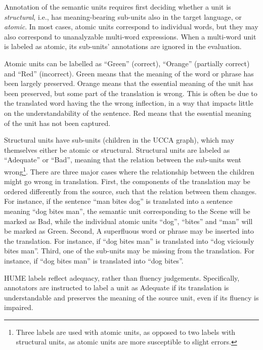 \documentclass[11pt,letterpaper]{article}
\newcommand{\XXX}[1]{{\color{red}XXX #1}} %
\begin{document}
Annotation of the semantic units requires first deciding whether
a unit is {\it structural}, i.e., has meaning-bearing sub-units also in the
target language,
or {\it atomic}. In most cases, atomic units
correspond to individual words, but they may also correspond to unanalyzable
multi-word expressions.
When a multi-word unit is labeled as atomic, its sub-units' annotations are ignored
in the evaluation.

Atomic units can be labelled as ``Green'' (correct), ``Orange'' (partially correct)
and ``Red'' (incorrect). 
Green means that the meaning of the word or phrase has been largely preserved.
Orange means that the essential meaning of the unit has been preserved,
but some part of the translation is wrong.
This is often be due to the translated word having the the wrong inflection,
in a way that impacts little on the understandability of the sentence.
Red means that the essential meaning of the unit has not been captured.

Structural units have sub-units (children in the UCCA graph), which may themselves
either be atomic or structural.
Structural units are labeled as ``Adequate'' or ``Bad'', meaning
that the relation between the sub-units went wrong\footnote{
  Three labels are used with atomic units, as opposed to two labels with structural units,
as atomic units are more susceptible to slight errors.}.
There are three major cases where the relationship between the children might go
wrong in translation.
First, the components of the translation may be ordered differently from the source,
such that the relation between them changes. For instance, if
the sentence ``man bites dog'' is translated into a sentence meaning ``dog bites man'',
the semantic unit corresponding to the Scene will be marked as Bad, while
the individual atomic units ``dog'', ``bites'' and ``man'' will be marked as Green.
Second, A superfluous word or phrase may be inserted into
the translation. For instance, if ``dog bites man'' is translated into ``dog viciously bites man''.
Third, one of the sub-units may be missing from the translation.
For instance, if ``dog bites man'' is translated into ``dog bites''. 

HUME labels reflect adequacy, rather than fluency judgements.
Specifically, annotators are instructed to
label a unit as Adequate if its translation is understandable and preserves
the meaning of the source unit, even if its fluency is impaired.
\end{document}
